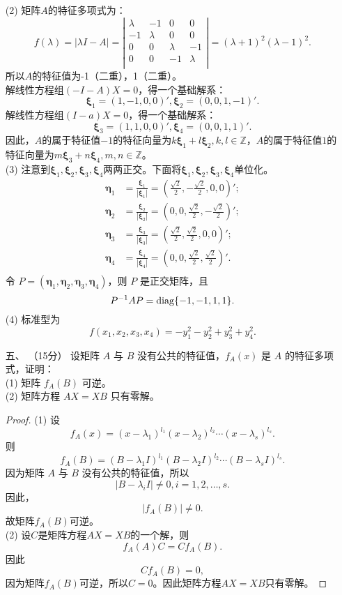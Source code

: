 \begin{enumerate}[1~]
\begin{solution}
(2) 矩阵$A$的特征多项式为：\[
f(\lambda)=|\lambda I-A|=\left| \begin{matrix}
	\lambda&		-1&		0&		0\\
	-1&		\lambda&		0&		0\\
	0&		0&		\lambda&		-1\\
	0&		0&		-1&		\lambda\\
\end{matrix} \right|=\left( \lambda +1 \right) ^2\left( \lambda -1 \right) ^2.
\]
所以$A$的特征值为-1（二重），1（二重）。\\
解线性方程组$(-I-A)X=0$，得一个基础解系：\[
\boldsymbol{\xi}_1=(1, -1, 0, 0)', \boldsymbol{\xi}_2=(0, 0, 1, -1)'.
\]
解线性方程组$(I-a)X=0$，得一个基础解系：\[
\boldsymbol{\xi}_3=(1, 1, 0, 0)', \boldsymbol{\xi}_4=(0, 0, 1, 1)'.
\]
因此，$A$的属于特征值$-1$的特征向量为$k\boldsymbol{\xi}_1+l\boldsymbol{\xi}_2, k, l\in \mathbb{Z}$，$A$的属于特征值$1$的特征向量为$m\boldsymbol{\xi}_3+n\boldsymbol{\xi}_4, m, n\in \mathbb{Z}$。\\
(3) 注意到$\boldsymbol{\xi}_1, \boldsymbol{\xi}_2, \boldsymbol{\xi}_3, \boldsymbol{\xi}_4$两两正交。下面将$\boldsymbol{\xi}_1, \boldsymbol{\xi}_2, \boldsymbol{\xi}_3, \boldsymbol{\xi}_4$单位化。\begin{align*}
\boldsymbol{\eta}_1&=\frac{\boldsymbol{\xi}_1}{|\boldsymbol{\xi}_1|}=\left(\frac{\sqrt{2}}{2}, -\frac{\sqrt{2}}{2}, 0, 0\right)';\\
\boldsymbol{\eta}_2&=\frac{\boldsymbol{\xi}_2}{|\boldsymbol{\xi}_2|}=\left(0, 0, \frac{\sqrt{2}}{2}, -\frac{\sqrt{2}}{2}\right)';\\
\boldsymbol{\eta}_3&=\frac{\boldsymbol{\xi}_3}{|\boldsymbol{\xi}_3|}=\left(\frac{\sqrt{2}}{2}, \frac{\sqrt{2}}{2}, 0, 0\right)';\\
\boldsymbol{\eta}_4&=\frac{\boldsymbol{\xi}_4}{|\boldsymbol{\xi}_4|}=\left(0, 0, \frac{\sqrt{2}}{2}, \frac{\sqrt{2}}{2}\right)'.\\
\end{align*}
令 $P=(\boldsymbol{\eta}_1, \boldsymbol{\eta}_2, \boldsymbol{\eta}_3, \boldsymbol{\eta}_4)$，则 $P$ 是正交矩阵，且\[
P^{-1}AP={\rm diag}\{-1, -1, 1, 1\}.
\]
(4) 标准型为\[
f(x_1, x_2, x_3, x_4)=-y_1^2-y_2^2+y_3^2+y_4^2.
\]
\end{solution}

\item[五、]（15分）
设矩阵 $A$ 与 $B$ 没有公共的特征值，$f_A(x)$ 是 $A$ 的特征多项式，证明：\\
(1) 矩阵 $f_A(B)$ 可逆。\\
(2) 矩阵方程 $AX = XB$ 只有零解。
\begin{proof}
(1) 设\[
f_A(x)=(x-\lambda_1)^{l_1} (x-\lambda_2)^{l_2} \cdots (x-\lambda_s)^{l_s}.
\]
则\[
f_A(B)=(B-\lambda_1I)^{l_1} (B-\lambda_2I)^{l_2} \cdots (B-\lambda_sI)^{l_s}.
\]
因为矩阵 $A$ 与 $B$ 没有公共的特征值，所以\[
|B-\lambda_i I|\ne 0, i=1, 2, \dots, s.
\]
因此，\[
|f_A(B)|\ne 0.
\]
故矩阵$f_A(B)$可逆。\\
(2) 设$C$是矩阵方程$AX=XB$的一个解，则\[
f_A(A)C=Cf_A(B).
\]
因此\[
Cf_A(B)=0,
\]
因为矩阵$f_A(B)$可逆，所以$C=0$。因此矩阵方程$AX=XB$只有零解。
\end{proof}


\end{enumerate}
